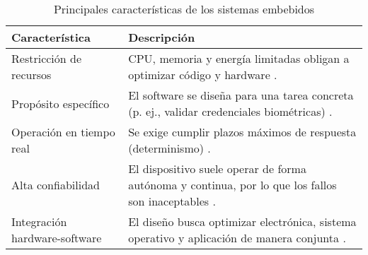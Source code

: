 \begin{table}[h!]
    \centering
    \begin{tabular}{l|p{10cm}}
    \hline
         \textbf{Característica} & \textbf{Descripción}\\
         \hline
         Restricción de recursos & CPU, memoria y energía limitadas obligan a optimizar código y hardware \cite{henriksson_2006}.\\
         Propósito  específico & El software se diseña para una tarea concreta (p. ej., validar credenciales biométricas) \cite{wolf_embedded_2012}.\\
         Operación en tiempo real & Se exige cumplir plazos máximos de respuesta (determinismo) \cite{shyamasundar_validating_2001}.\\
         Alta confiabilidad & El dispositivo suele operar de forma autónoma y continua, por lo que los fallos son inaceptables \cite{windriver_embedded_security}.\\
         Integración hardware-software & El diseño busca optimizar electrónica, sistema operativo y aplicación de manera conjunta \cite{wolf_embedded_2012}.\\
         \hline
    \end{tabular}
    \captionsetup{justification=centering}
    \caption{Principales características de los sistemas embebidos}
    \label{tab:embedded_characteristics}
\end{table}